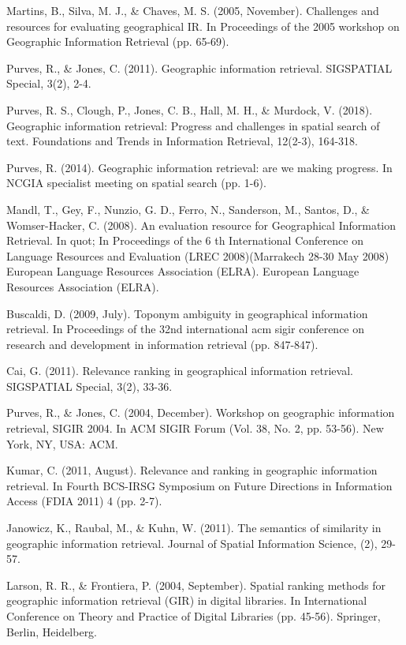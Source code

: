 \documentclass{irsarticle}
\begin{document}
\begin{thebibliography}{}
Martins, B., Silva, M. J., \& Chaves, M. S. (2005, November). Challenges and
resources for evaluating geographical IR. In Proceedings of the 2005 workshop
on Geographic Information Retrieval (pp. 65-69).

Purves, R., \& Jones, C. (2011). Geographic information retrieval. SIGSPATIAL
Special, 3(2), 2-4.

Purves, R. S., Clough, P., Jones, C. B., Hall, M. H., \& Murdock, V. (2018).
Geographic information retrieval: Progress and challenges in spatial search of
text. Foundations and Trends in Information Retrieval, 12(2-3), 164-318.

Purves, R. (2014). Geographic information retrieval: are we making progress. In
NCGIA specialist meeting on spatial search (pp. 1-6).

Mandl, T., Gey, F., Nunzio, G. D., Ferro, N., Sanderson, M., Santos, D., \&
Womser-Hacker, C. (2008). An evaluation resource for Geographical Information
Retrieval. In quot; In Proceedings of the 6 th International Conference on
Language Resources and Evaluation (LREC 2008)(Marrakech 28-30 May 2008)
European Language Resources Association (ELRA). European Language Resources
Association (ELRA).

Buscaldi, D. (2009, July). Toponym ambiguity in geographical information
retrieval. In Proceedings of the 32nd international acm sigir conference on
research and development in information retrieval (pp. 847-847).

Cai, G. (2011). Relevance ranking in geographical information retrieval.
SIGSPATIAL Special, 3(2), 33-36.

Purves, R., \& Jones, C. (2004, December). Workshop on geographic information
retrieval, SIGIR 2004. In ACM SIGIR Forum (Vol. 38, No. 2, pp. 53-56). New
York, NY, USA: ACM.

Kumar, C. (2011, August). Relevance and ranking in geographic information
retrieval. In Fourth BCS-IRSG Symposium on Future Directions in Information
Access (FDIA 2011) 4 (pp. 2-7).

Janowicz, K., Raubal, M., \& Kuhn, W. (2011). The semantics of similarity in
geographic information retrieval. Journal of Spatial Information Science, (2),
29-57.

Larson, R. R., \& Frontiera, P. (2004, September). Spatial ranking methods for
geographic information retrieval (GIR) in digital libraries. In International
Conference on Theory and Practice of Digital Libraries (pp. 45-56). Springer,
Berlin, Heidelberg.


\end{thebibliography}
\end{document}
